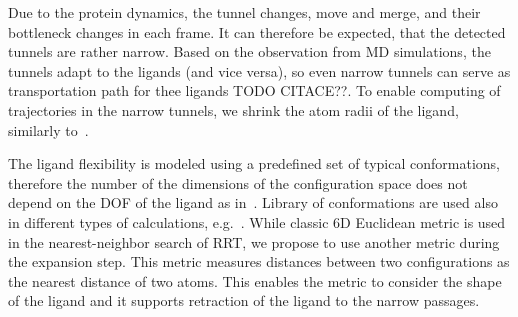 \documentclass[usletter, 10pt, conference]{ieeeconf} %
\begin{document}
Due to the protein dynamics, the tunnel changes, move and merge, and their bottleneck changes in each frame.
It can therefore be expected, that the detected tunnels are rather narrow.
Based on the observation from MD simulations, the tunnels adapt to the ligands (and vice versa), so even narrow tunnels can serve as transportation path for thee ligands TODO CITACE??.
To enable computing of trajectories in the narrow tunnels, we shrink the atom radii of the ligand, similarly to~\cite{cortes2010simulating,guieysse2008structure}.

The ligand flexibility is modeled using a predefined set of typical conformations, therefore the number of the dimensions of the configuration space does not depend on the DOF of the ligand as in~\cite{cortes2010simulating}.
Library of conformations are used also in different types of calculations, e.g.~\cite{kellogg}. 
While classic 6D Euclidean metric is used in the nearest-neighbor search of RRT, we propose to use another metric during the expansion step.
This metric measures distances between two configurations as the nearest distance of two atoms. 
This enables the metric to consider the shape of the ligand and it supports retraction of the ligand to the narrow passages.


\end{document}
